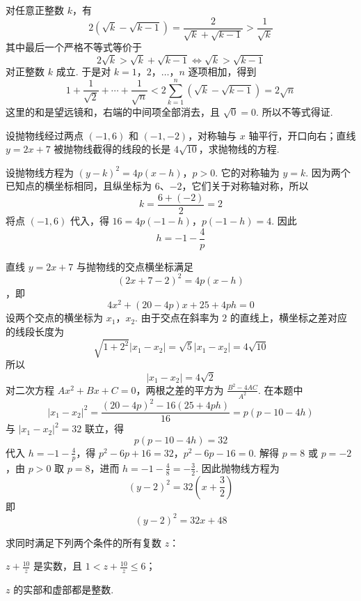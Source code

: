 \documentclass[UTF8,a4paper,oneside,11pt]{ctexbook}
\begin{document}
\begin{solution}
对任意正整数 \(k\)，有
\[
2\left(\sqrt{k}-\sqrt{k-1}\right)=\frac{2}{\sqrt{k}+\sqrt{k-1}}>\frac{1}{\sqrt{k}}
\]
其中最后一个严格不等式等价于
\[
2\sqrt{k}>\sqrt{k}+\sqrt{k-1}
\Longleftrightarrow \sqrt{k}>\sqrt{k-1}
\]
对正整数 \(k\) 成立. 于是对 \(k=1\)，\(2\)，\(\ldots\)，\(n\) 逐项相加，得到
\[
1+\frac{1}{\sqrt{2}}+\cdots+\frac{1}{\sqrt{n}}
<2\sum_{k=1}^{n}\left(\sqrt{k}-\sqrt{k-1}\right)=2\sqrt{n}
\]
这里的和是望远镜和，右端的中间项全部消去，且 \(\sqrt0=0\). 所以不等式得证.
\end{solution}

\begin{problem}
设抛物线经过两点 \((-1,6)\) 和 \((-1,-2)\)，对称轴与 \(x\) 轴平行，开口向右；直线 \(y=2x+7\) 被抛物线截得的线段的长是 \(4\sqrt{10}\)，求抛物线的方程.
\end{problem}

\begin{solution}
设抛物线方程为
\((y-k)^2=4p(x-h)\)，\(p>0\).
它的对称轴为 \(y=k\). 因为两个已知点的横坐标相同，且纵坐标为 \(6\)、\(-2\)，它们关于对称轴对称，所以
\[
k=\frac{6+(-2)}2=2
\]
将点 \((-1,6)\) 代入，得
\(16=4p(-1-h)\)，\(p(-1-h)=4\).
因此
\[
h=-1-\frac4p
\]

直线 \(y=2x+7\) 与抛物线的交点横坐标满足
\[
(2x+7-2)^2=4p(x-h)
\]
，即
\[
4x^2+(20-4p)x+25+4ph=0
\]
设两个交点的横坐标为 \(x_1\)，\(x_2\). 由于交点在斜率为 \(2\) 的直线上，横坐标之差对应的线段长度为
\[
\sqrt{1+2^2}|x_1-x_2|=\sqrt{5}|x_1-x_2|=4\sqrt{10}
\]
所以
\[
|x_1-x_2|=4\sqrt2
\]
对二次方程 \(Ax^2+Bx+C=0\)，两根之差的平方为 \(\frac{B^2-4AC}{A^2}\). 在本题中
\[
|x_1-x_2|^2
=\frac{(20-4p)^2-16(25+4ph)}{16}
=p(p-10-4h)
\]
与 \(|x_1-x_2|^2=32\) 联立，得
\[
p(p-10-4h)=32
\]
代入 \(h=-1-\frac4p\)，得
\(p^2-6p+16=32\)，\(p^2-6p-16=0\).
解得 \(p=8\) 或 \(p=-2\)，由 \(p>0\) 取 \(p=8\)，进而 \(h=-1-\frac48=-\frac32\). 因此抛物线方程为
\[
(y-2)^2=32\left(x+\frac32\right)
\]
即
\[
(y-2)^2=32x+48
\]
\end{solution}

\begin{problem}
求同时满足下列两个条件的所有复数 \(z\)：
\begin{circlelist}
\item \(z+\frac{10}{z}\) 是实数，且 \(1<z+\frac{10}{z}\leqslant 6\)；
\item \(z\) 的实部和虚部都是整数.
\end{circlelist}
\end{problem}
\end{document}
